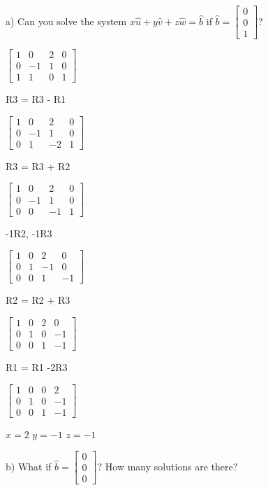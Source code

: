 \documentclass{article}
\begin{document}
a) Can you solve the system $x\hat{u} + y\hat{v} + z\hat{w} = \hat{b}$ if $\hat{b} = \begin{bmatrix}
    0 \\ 0 \\ 1
\end{bmatrix}$?

$\begin{bmatrix}
    1 & 0 & 2 & 0 \\
    0 & -1 & 1 & 0 \\
    1 & 1 & 0 & 1
\end{bmatrix}$

R3 = R3 - R1

$\begin{bmatrix}
    1 & 0 & 2 & 0 \\
    0 & -1 & 1 & 0 \\
    0 & 1 & -2 & 1
\end{bmatrix}$

R3 = R3 + R2

$\begin{bmatrix}
    1 & 0 & 2 & 0 \\
    0 & -1 & 1 & 0 \\
    0 & 0 & -1 & 1
\end{bmatrix}$

-1R2, -1R3

$\begin{bmatrix}
    1 & 0 & 2 & 0 \\
    0 & 1 & -1 & 0 \\
    0 & 0 & 1 & -1
\end{bmatrix}$

R2 = R2 + R3

$\begin{bmatrix}
    1 & 0 & 2 & 0 \\
    0 & 1 & 0 & -1 \\
    0 & 0 & 1 & -1
\end{bmatrix}$

R1 = R1 -2R3

$\begin{bmatrix}
    1 & 0 & 0 & 2 \\
    0 & 1 & 0 & -1 \\
    0 & 0 & 1 & -1
\end{bmatrix}$

$x = 2$
$y = -1$
$z = -1$

b) What if $\hat{b} = \begin{bmatrix}
    0 \\ 0 \\ 0
\end{bmatrix}$? How many solutions are there?
\end{document}
